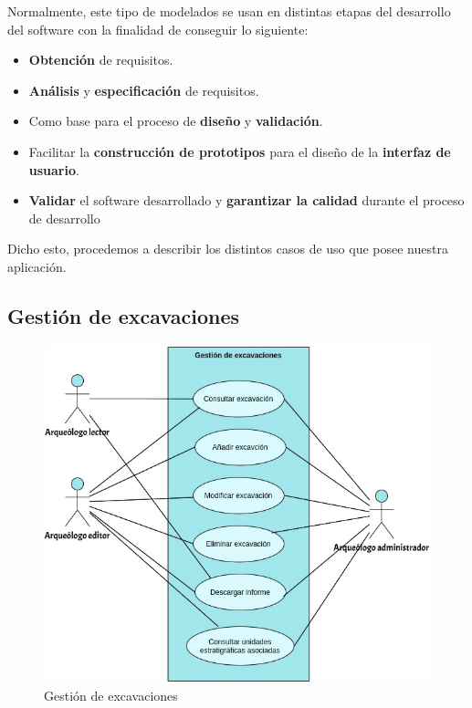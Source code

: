 Normalmente, este tipo de modelados se usan en distintas etapas del desarrollo del
software con la finalidad de conseguir lo siguiente:

    \begin{itemize}
        \item \textbf{Obtención} de requisitos.
        \item \textbf{Análisis} y \textbf{especificación} de requisitos.
        \item Como base para el proceso de \textbf{diseño} y \textbf{validación}.
        \item Facilitar la \textbf{construcción de prototipos} para el diseño de la
        \textbf{interfaz de usuario}.
        \item \textbf{Validar} el software desarrollado y \textbf{garantizar la calidad}
        durante el proceso de desarrollo
    \end{itemize}

Dicho esto, procedemos a describir los distintos casos de uso que posee nuestra aplicación.

\subsection{Gestión de excavaciones}
    \begin{figure}[H]
        \centering
        \includegraphics[scale=0.50]{imagenes/diagramas CU/excavation-UC.png}
        \caption{Gestión de excavaciones}
        \label{fig:excavation-management}
    \end{figure}

